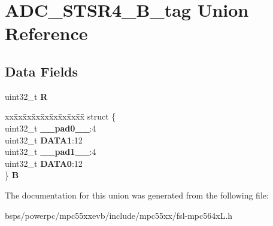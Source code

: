 \hypertarget{unionADC__STSR4__32B__tag}{}\section{A\+D\+C\+\_\+\+S\+T\+S\+R4\+\_\+B\+\_\+tag Union Reference}
\label{unionADC__STSR4__32B__tag}
\subsection*{Data Fields}
\begin{DoxyCompactItemize}
\item 
\mbox{\label{unionADC__STSR4__32B__tag_a96b5c7949bfb1e46453ad19a449e5d82}} 
uint32\+\_\+t {\bfseries R}
\item 
\mbox{\label{unionADC__STSR4__32B__tag_abc33bde7db8b730538ffae176cf768ac}} 
\begin{tabbing}
xx\=xx\=xx\=xx\=xx\=xx\=xx\=xx\=xx\=\kill
struct \{\\
\>uint32\_t {\bfseries \_\_pad0\_\_}:4\\
\>uint32\_t {\bfseries DATA1}:12\\
\>uint32\_t {\bfseries \_\_pad1\_\_}:4\\
\>uint32\_t {\bfseries DATA0}:12\\
\} {\bfseries B}\\

\end{tabbing}\end{DoxyCompactItemize}


The documentation for this union was generated from the following file\+:\begin{DoxyCompactItemize}
\item 
bsps/powerpc/mpc55xxevb/include/mpc55xx/fsl-\/mpc564x\+L.\+h\end{DoxyCompactItemize}
